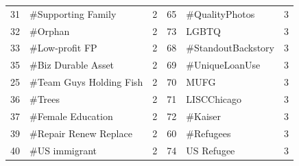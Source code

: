 \begin{longtable}{|r|l|l|r|l|l|}
    31                                & \#Supporting Family                & 2                                                       & 65                               & \#QualityPhotos                     & 3                                                      \\
    32                                & \#Orphan                           & 2                                                       & 73                               & LGBTQ                               & 3                                                      \\
    33                                & \#Low-profit FP                    & 2                                                       & 68                               & \#StandoutBackstory                 & 3                                                      \\
    35                                & \#Biz Durable Asset                & 2                                                       & 69                               & \#UniqueLoanUse                     & 3                                                      \\
    25                                & \#Team Guys Holding Fish           & 2                                                       & 70                               & MUFG                                & 3                                                      \\
    36                                & \#Trees                            & 2                                                       & 71                               & LISCChicago                         & 3                                                      \\
    37                                & \#Female Education                 & 2                                                       & 72                               & \#Kaiser                            & 3                                                      \\
    39                                & \#Repair Renew Replace             & 2                                                       & 60                               & \#Refugees                          & 3                                                      \\
    40                                & \#US immigrant                     & 2                                                       & 74                               & US Refugee                          & 3                                                      \\

\end{longtable}

